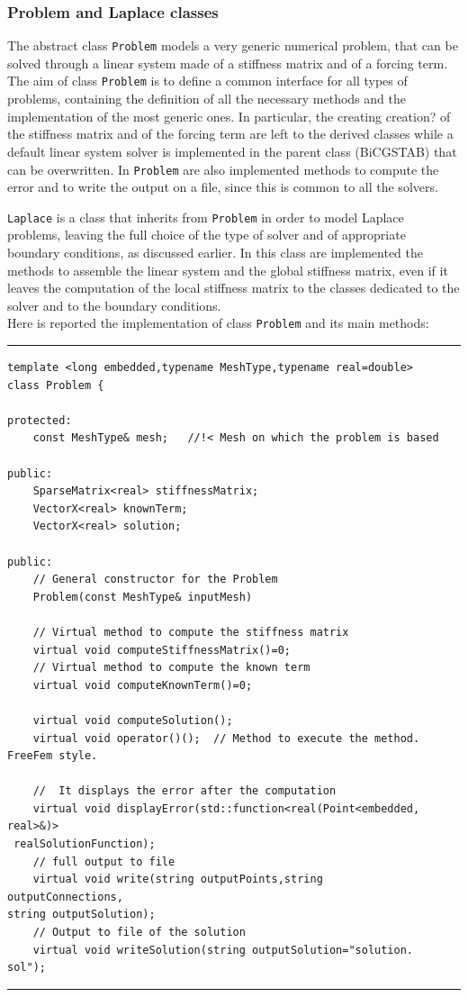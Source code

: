 \subsubsection{Problem and Laplace classes}
The abstract class \verb|Problem| models a very generic numerical problem, that can be solved through a linear system made of a stiffness matrix and of a forcing term. The aim of class \verb|Problem| is to define a common interface for all types of problems, containing the definition of all the necessary methods and the implementation of the most generic ones. In particular, the creating {\color{red} creation?} of the stiffness matrix and of the forcing term are left to the derived classes while a default linear system solver is implemented in the parent class (BiCGSTAB) that can be overwritten. In \verb|Problem| are also implemented methods to compute the error and to write the output on a file, since this is common to all the solvers. 

\verb|Laplace| is a class that inherits from \verb|Problem| in order to model Laplace problems, leaving the full choice of the type of solver and of appropriate boundary conditions, as discussed earlier. In this class are implemented the methods to assemble the linear system and the global stiffness matrix, even if it leaves the computation of the local stiffness matrix to the classes dedicated to the solver and to the boundary conditions. \\

Here is reported the implementation of class \verb|Problem| and its main methods:

\noindent\rule{12.7cm}{1pt}
\begin{lstlisting}[caption=File \texttt{Problem.h}]
template <long embedded,typename MeshType,typename real=double>
class Problem {
	
protected:
    const MeshType& mesh;	//!< Mesh on which the problem is based

public:
    SparseMatrix<real> stiffnessMatrix;
    VectorX<real> knownTerm;
    VectorX<real> solution;
	
public:
    // General constructor for the Problem
    Problem(const MeshType& inputMesh)

    // Virtual method to compute the stiffness matrix
    virtual void computeStiffnessMatrix()=0;
    // Virtual method to compute the known term
    virtual void computeKnownTerm()=0;	

    virtual void computeSolution();
    virtual void operator()();  // Method to execute the method.
FreeFem style.

    //  It displays the error after the computation
    virtual void displayError(std::function<real(Point<embedded,
real>&)>
 realSolutionFunction);
    // full output to file 
    virtual void write(string outputPoints,string 
outputConnections,
string outputSolution);	
    // Output to file of the solution
    virtual void writeSolution(string outputSolution="solution.
sol");
\end{lstlisting}
\noindent\rule{12.7cm}{1pt}\\

